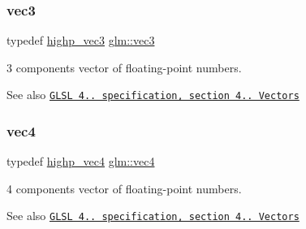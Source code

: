 \subsubsection{\texorpdfstring{vec3}{vec3}}
{\footnotesize\ttfamily typedef \hyperlink{group__core__precision_ga1ef07d2502ea09b1e63998813a3d4330}{highp\+\_\+vec3} \hyperlink{group__core__types_ga1c47e8b3386109bc992b6c48e91b0be7}{glm\+::vec3}}

3 components vector of floating-\/point numbers.

\begin{DoxySeeAlso}{See also}
\href{http://www.opengl.org/registry/doc/GLSLangSpec.4.20.8.pdf}{\tt G\+L\+SL 4.. specification, section 4.. Vectors} 
\end{DoxySeeAlso}
\mbox{\label{group__core__types_ga5881b1b022d7fd1b7218f5916532dd02}} 
\subsubsection{\texorpdfstring{vec4}{vec4}}
{\footnotesize\ttfamily typedef \hyperlink{group__core__precision_ga5f573b0132805b54cb9205eea1c86483}{highp\+\_\+vec4} \hyperlink{group__core__types_ga5881b1b022d7fd1b7218f5916532dd02}{glm\+::vec4}}

4 components vector of floating-\/point numbers.

\begin{DoxySeeAlso}{See also}
\href{http://www.opengl.org/registry/doc/GLSLangSpec.4.20.8.pdf}{\tt G\+L\+SL 4.. specification, section 4.. Vectors} 
\end{DoxySeeAlso}
